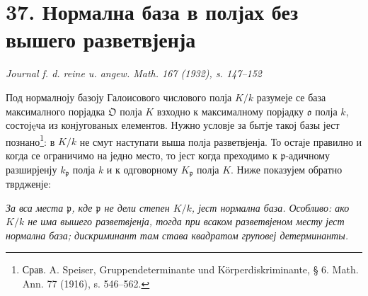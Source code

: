 \documentclass[11pt]{article}
\providecommand{\frakO}{\mathfrak{O}}
\providecommand{\frako}{\mathfrak{o}}
\providecommand{\frakp}{\mathfrak{p}}
\begin{document}
\section*{37. Нормална база в полјах без вышего разветвјенја}

\begin{center}
\emph{Journal f. d. reine u. angew. Math. 167 (1932), s. 147--152}
\end{center}

Под нормалноју базоју Галоисового числового полја \(K/k\) разумеје се база максималного порјадка \(\frakO\) полја \(K\) взходно к максималному порјадку \(\frako\) полја \(k\), состојęча из конјугованых елементов. Нужно условје за бытје такој базы јест познано\footnote{Срав. A. Speiser, Gruppendeterminante und Körperdiskriminante, § 6. Math. Ann. 77 (1916), s. 546--562.}: в \(K/k\) не смут наступати выша полја разветвјенја. То остаје правилно и когда се ограничимо на једно место, то јест когда преходимо к \(\frakp\)-адичному разширјенју \(k_\frakp\) полја \(k\) и к одговорному \(K_\frakp\) полја \(K\). Ниже показујем обратно тврдженје:

\emph{За вса места \(\frakp\), кде \(\frakp\) не дели степен \(K/k\), јест нормална база. Особливо: ако \(K/k\) не има вышего разветвјенја, тогда при всаком разветвјеном месту јест нормална база; дискриминант там става квадратом груповеј детерминанты.}
\end{document}
